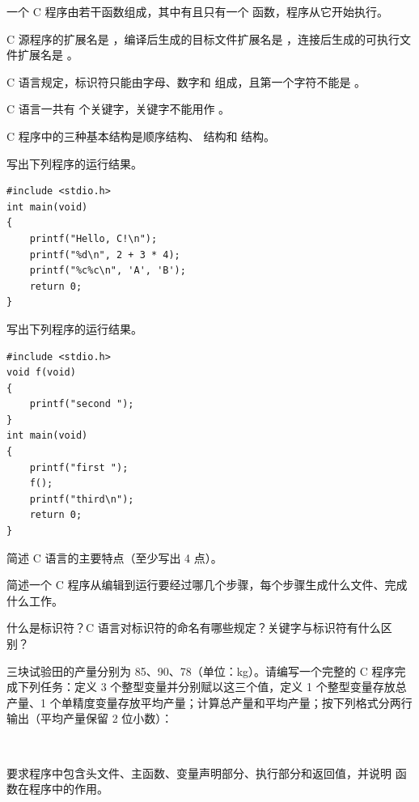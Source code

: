 \documentclass[a4paper,11pt]{article}
\begin{document}
\q 一个 C 程序由若干函数组成，其中有且只有一个 \fillblank{} 函数，程序从它开始执行。

\q C 源程序的扩展名是 \fillblank{}，编译后生成的目标文件扩展名是 \fillblank{}，连接后生成的可执行文件扩展名是 \fillblank{}。

\q C 语言规定，标识符只能由字母、数字和 \fillblank{} 组成，且第一个字符不能是 \fillblank{}。

\q C 语言一共有 \fillblank{} 个关键字，关键字不能用作 \fillblank{}。

\q C 程序中的三种基本结构是顺序结构、\fillblank{} 结构和 \fillblank{} 结构。


\q 写出下列程序的运行结果。
\begin{lstlisting}[language={[custom]C}]
#include <stdio.h>
int main(void)
{
    printf("Hello, C!\n");
    printf("%d\n", 2 + 3 * 4);
    printf("%c%c\n", 'A', 'B');
    return 0;
}
\end{lstlisting}
\anslines{2.6cm}

\q 写出下列程序的运行结果。
\begin{lstlisting}[language={[custom]C}]
#include <stdio.h>
void f(void)
{
    printf("second ");
}
int main(void)
{
    printf("first ");
    f();
    printf("third\n");
    return 0;
}
\end{lstlisting}
\anslines{2.6cm}


\q 简述 C 语言的主要特点（至少写出 4 点）。\anslines{3.0cm}

\q 简述一个 C 程序从编辑到运行要经过哪几个步骤，每个步骤生成什么文件、完成什么工作。\anslines{3.2cm}

\q 什么是标识符？C 语言对标识符的命名有哪些规定？关键字与标识符有什么区别？\anslines{3.2cm}

\newpage
{}

\q 三块试验田的产量分别为 85、90、78（单位：kg）。请编写一个完整的 C 程序完成下列任务：定义 3 个整型变量并分别赋以这三个值，定义 1 个整型变量存放总产量、1 个单精度变量存放平均产量；计算总产量和平均产量；按下列格式分两行输出（平均产量保留 2 位小数）：
\par\vspace{0.15em}
\noindent\hspace{2em}\\
\noindent\hspace{2em}

\noindent 要求程序中包含头文件、主函数、变量声明部分、执行部分和返回值，并说明  函数在程序中的作用。\anslines{4.0cm}
\end{document}
